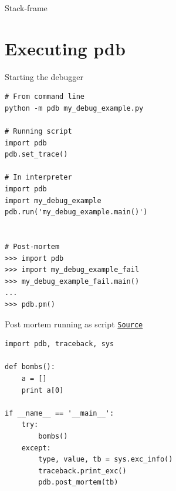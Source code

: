 \documentclass[
    size=20pt,
    style=sailor,
    display=slides,
    paper=smartboard,
    orient=landscape,
]{powerdot}
\begin{document}
\begin{slide}[method=file]{Stack-frame}
\begin{figure}[h!tb]
{    }
    \vspace{-4cm}
    \vspace{-4cm}
   \end{figure}
 \vspace{-1cm}
\end{slide}


\section{Executing pdb}


\begin{slide}[method=file]{Starting the debugger}
   \begin{verbatim}
# From command line
python -m pdb my_debug_example.py

# Running script
import pdb
pdb.set_trace()

# In interpreter
import pdb
import my_debug_example
pdb.run('my_debug_example.main()')


# Post-mortem
>>> import pdb
>>> import my_debug_example_fail
>>> my_debug_example_fail.main()
...
>>> pdb.pm()

  \end{verbatim}
\end{slide}


\begin{slide}[method=file]{Post mortem running as script}
\href{http://stackoverflow.com/questions/242485/starting-python-debugger-automatically-on-error}{
\texttt{Source}}
   \begin{verbatim}
import pdb, traceback, sys

def bombs():
    a = []
    print a[0]

if __name__ == '__main__':
    try:
        bombs()
    except:
        type, value, tb = sys.exc_info()
        traceback.print_exc()
        pdb.post_mortem(tb)
  \end{verbatim}
\end{slide}
\end{document}
